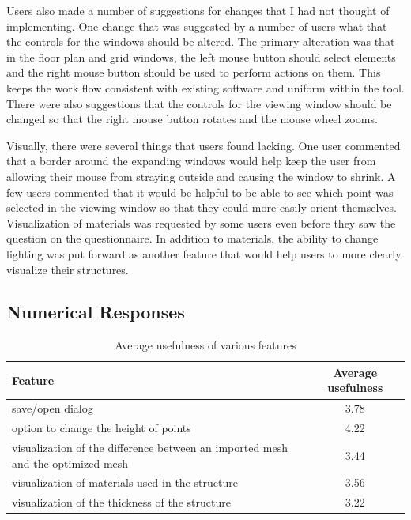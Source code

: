 \documentclass{thesis}
\begin{document}
Users also made a number of suggestions for changes that I had not thought of implementing.  One change that was suggested
by a number of users what that the controls for the windows should be altered.  The primary alteration was that in the
floor plan and grid windows, the left mouse button should select elements and the right mouse button should be used to
perform actions on them.  This keeps the work flow consistent with existing software and uniform within the tool.  There
were also suggestions that the controls for the viewing window should be changed so that the right mouse button rotates
and the mouse wheel zooms.

Visually, there were several things that users found lacking.  One user commented that a border around the expanding windows
would help keep the user from allowing their mouse from straying outside and causing the window to shrink.  A few users
commented that it would be helpful to be able to see which point was selected in the viewing window so that they could more
easily orient themselves.  Visualization of materials was requested by some users even before they saw the question on the
questionnaire.  In addition to materials, the ability to change lighting was put forward as another feature that would help
users to more clearly visualize their structures.

\subsection{Numerical Responses}
\begin{table}
\begin{center}
  \begin{tabular}{ | p{3in} | c | }
    \hline
    Feature & Average usefulness \\ \hline
	save/open dialog & 3.78 \\ \hline
	option to change the height of points & 4.22 \\ \hline
	visualization of the difference between an imported mesh and the optimized mesh & 3.44 \\ \hline
	visualization of materials used in the structure & 3.56 \\ \hline
    visualization of the thickness of the structure & 3.22 \\ \hline
  \end{tabular}
  \caption{Average usefulness of various features}
  \label{tbl:features}
\end{center}
\end{table}
\end{document}
